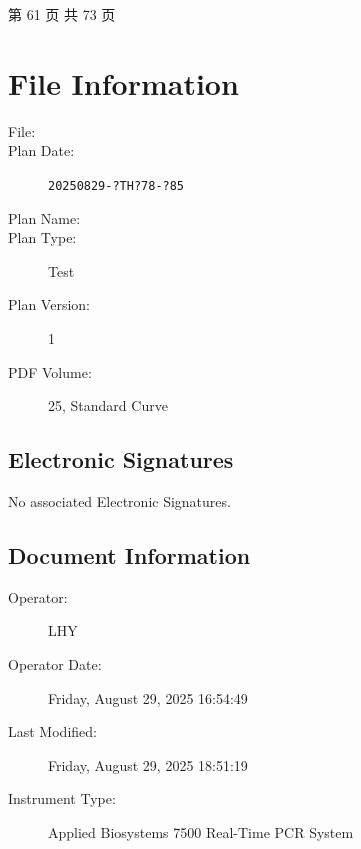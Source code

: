 \documentclass[UTF8,10pt,a4paper,fontset=fandol]{ctexart}
\newcommand{\fieldvalue}[1]{#1}
\begin{document}
\begin{center}
\small 第 61 页 共 73 页
\end{center}

\newpage

\section{File Information}

\begin{description}
\item[File:] 
\item[Plan Date:] %
\fieldvalue{\texttt{20250829-?TH?78-?85}}
\item[Plan Name:] 
\item[Plan Type:] %
\fieldvalue{Test}
\item[Plan Version:] %
\fieldvalue{1}
\item[PDF Volume:] %
\fieldvalue{25, Standard Curve}
\end{description}

\subsection{Electronic Signatures}

No associated Electronic Signatures.

\subsection{Document Information}

\begin{description}
\item[Operator:] %
\fieldvalue{LHY}
\item[Operator Date:] %
\fieldvalue{Friday, August 29, 2025 16:54:49}
\item[Last Modified:] %
\fieldvalue{Friday, August 29, 2025 18:51:19}
\item[Instrument Type:] %
\fieldvalue{Applied Biosystems 7500 Real-Time PCR System}
\end{description}
\end{document}
